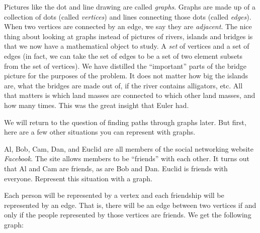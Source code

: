\documentclass[12pt]{article}
\begin{document}
Pictures like the dot and line drawing are called {\em graphs}. %
Graphs are made up of a collection of dots (called {\em vertices}) and lines connecting those dots (called \emph{edges}).  When two vertices are connected by an edge, we say they are \emph{adjacent}.  The nice thing about looking at graphs instead of pictures of rivers, islands and bridges is that we now have a mathematical object to study.  A {\em set} of vertices and a set of edges (in fact, we can take the set of edges to be a set of two element subsets from the set of vertices).  We have distilled the ``important'' parts of the bridge picture for the purposes of the problem.  It does not matter how big the islands are, what the bridges are made out of, if the river contains alligators, etc.  All that matters is which land masses are connected to which other land masses, and how many times.  This was the great insight that Euler had.

We will return to the question of finding paths through graphs later.  But first, here are a few other situations you can represent with graphs.

\begin{example}
  Al, Bob, Cam, Dan, and Euclid are all members of the social networking website {\em Facebook}.  The site allows members to be ``friends'' with each other.  It turns out that Al and Cam are friends, as are Bob and Dan.  Euclid is friends with everyone.  Represent this situation with a graph.
  \begin{solution}
    Each person will be represented by a vertex and each friendship will be represented by an edge.  That is, there will be an edge between two vertices if and only if the people represented by those vertices are friends.  We get the following graph:
    
    \begin{center}
    \end{center}
  \end{solution}

\end{example}
\end{document}
